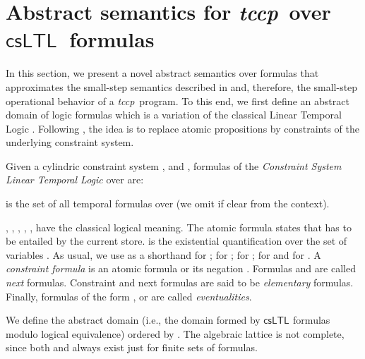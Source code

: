 \documentclass[american]{new_tlp}
\newcommand*{\csltl}[1][]{\ensuremath{\textsf{csLTL}_{#1}}}
\newcommand*{\tccp}{\textit{tccp}}
\providecommand*{\ie}   {i.e.,}
\begin{document}
\section{Abstract semantics for \tccp\ over \csltl\ formulas} 
\label{sec:CLTLabstr}


In this section, we present a novel abstract semantics over formulas that
approximates the small-step semantics described in  and,
therefore, the small-step operational behavior of a \tccp\ program.  To
this end, we first define an abstract domain of logic formulas which is a
variation of the classical Linear Temporal Logic \cite{MannaP92}.
Following \cite{PalamidessiV-CP2001,deBoerGM01,deBoerGM02,Valencia05}, the
idea is to replace atomic propositions by constraints of the underlying
constraint system.
\begin{definition}[\csltl{} formulas] \label{def:tf}
    Given a cylindric constraint system ,  and
    , formulas of the \emph{Constraint System Linear Temporal
    Logic} over  are:
    
     is the set of all temporal formulas over  (we
    omit  if clear from the context).
\end{definition}
, , , , ,
 have the classical logical meaning.  The atomic
formula  states that  has to be entailed by the current
store.   is the existential quantification over the set of
variables .  As usual, we use  as a shorthand
for ;  for
;  for
;
 for  and  for
.  A \emph{constraint formula} is an
atomic formula  or its negation .  Formulas  and
 are called \emph{next} formulas.  Constraint and next
formulas are said to be \emph{elementary} formulas.  Finally, formulas of
the form ,  or
 are called \emph{eventualities}.

We define the abstract domain  (\ie{} the
domain formed by \csltl{} formulas modulo logical equivalence) ordered by 
.
The algebraic lattice  is not complete, since both 
and  always exist just for finite sets of formulas.
\end{document}
